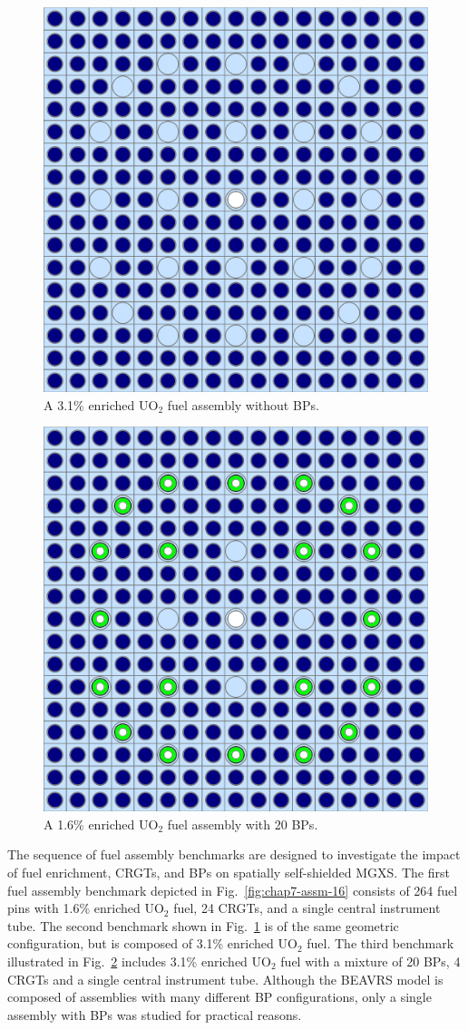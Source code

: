 \begin{figure}[h!]
  \centering
  \includegraphics[width=0.65\linewidth]{figures/benchmarks/assembly-31}
\vspace{2mm}
\caption[BEAVRS 3.1\% enriched assembly]{A 3.1\% enriched UO$_2$ fuel assembly without \acp{BP}.}
\label{fig:chap7-assm-31}
\end{figure}

\begin{figure}[h!]
  \centering
  \includegraphics[width=0.65\linewidth]{figures/benchmarks/assembly-31-20BPs}
\vspace{2mm}
\caption[BEAVRS 3.1\% enriched assembly with 20 BPs]{A 1.6\% enriched UO$_2$ fuel assembly with 20 \acp{BP}.}
\label{fig:chap7-assm-31-20BPs}
\end{figure}

The sequence of fuel assembly benchmarks are designed to investigate the impact of fuel enrichment, \acp{CRGT}, and \acp{BP} on spatially self-shielded \ac{MGXS}. The first fuel assembly benchmark depicted in Fig.~\ref{fig:chap7-assm-16} consists of 264 fuel pins with 1.6\% enriched UO$_2$ fuel, 24 \acp{CRGT}, and a single central instrument tube. The second benchmark shown in Fig.~\ref{fig:chap7-assm-31} is of the same geometric configuration, but is composed of 3.1\% enriched UO$_2$ fuel. The third benchmark illustrated in Fig.~\ref{fig:chap7-assm-31-20BPs} includes 3.1\% enriched UO$_2$ fuel with a mixture of 20 \acp{BP}, 4 \acp{CRGT} and a single central instrument tube. Although the \ac{BEAVRS} model is composed of assemblies with many different \ac{BP} configurations, only a single assembly with \acp{BP} was studied for practical reasons.

